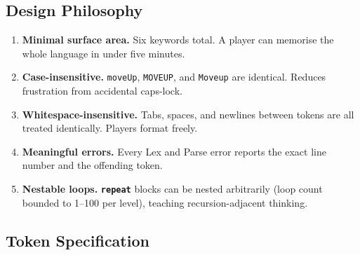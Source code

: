 \documentclass[12pt,a4paper]{article}
\newcommand{\keyword}[1]{\textcolor{keyword}{\texttt{\bfseries #1}}}
\begin{document}
\subsection{Design Philosophy}

\begin{tcolorbox}[redbox, title={Language Design Goals}]
\begin{enumerate}[label=\textbf{G\arabic*.}, leftmargin=3em, noitemsep]
  \item \textbf{Minimal surface area.} Six keywords total. A player can memorise the whole language in under five minutes.
  \item \textbf{Case-insensitive.} \texttt{moveUp}, \texttt{MOVEUP}, and \texttt{Moveup} are identical. Reduces frustration from accidental caps-lock.
  \item \textbf{Whitespace-insensitive.} Tabs, spaces, and newlines between tokens are all treated identically. Players format freely.
  \item \textbf{Meaningful errors.} Every Lex and Parse error reports the exact line number and the offending token.
  \item \textbf{Nestable loops.} \keyword{repeat} blocks can be nested arbitrarily (loop count bounded to 1--100 per level), teaching recursion-adjacent thinking.
\end{enumerate}
\end{tcolorbox}

\subsection{Token Specification}
\end{document}
